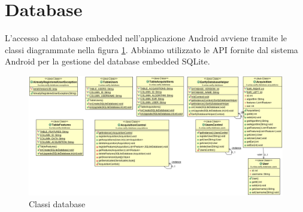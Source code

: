 \section{Database}
L'accesso al database embedded nell'applicazione Android avviene tramite le classi diagrammate nella figura \ref{fig:db}. Abbiamo utilizzato le API fornite dal sistema Android per la gestione del database embedded SQLite.

\begin{figure}[ht]
	\centering
	\includegraphics[width=1.5\textwidth, angle=90]{img/db.png}
	\caption{Classi database}\label{fig:db}
\end{figure}

